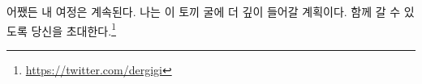 \begin{comment}
In any case, my journey continues. I plan to venture further down into the
depths of this rabbit hole, and I invite you to tag
along for the ride.\footnote{\url{https://twitter.com/dergigi}}
\end{comment}
어쨌든 내 여정은 계속된다. 나는 이 토끼 굴에 더 깊이 들어갈 계획이다.
함께 갈 수 있도록 당신을 초대한다.\footnote{\url{https://twitter.com/dergigi}}

%
